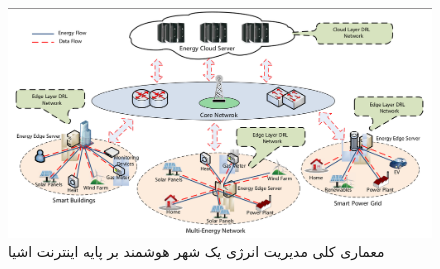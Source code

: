 \begin{figure}[!h]
\centerline{\includegraphics[width=.85\textwidth]{f-2-1.png}}
\caption{معماری کلی مدیریت انرژی یک شهر هوشمند بر پایه اینترنت اشیا}
\end{figure}
